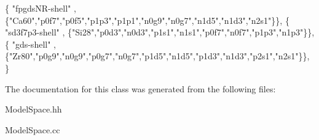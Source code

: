 \begin{DoxyCode}
\{ \textcolor{stringliteral}{"fpgdsNR-shell"}  ,   \{\textcolor{stringliteral}{"Ca60"},\textcolor{stringliteral}{"p0f7"},\textcolor{stringliteral}{"p0f5"},\textcolor{stringliteral}{"p1p3"},\textcolor{stringliteral}{"p1p1"},\textcolor{stringliteral}{"n0g9"},\textcolor{stringliteral}{"n0g7"},\textcolor{stringliteral}{"n1d5"},\textcolor{stringliteral}{"n1d3"},\textcolor{stringliteral}{"n2s1"}\}\}, 
\{ \textcolor{stringliteral}{"sd3f7p3-shell"}  ,   \{\textcolor{stringliteral}{"Si28"},\textcolor{stringliteral}{"p0d3"},\textcolor{stringliteral}{"n0d3"},\textcolor{stringliteral}{"p1s1"},\textcolor{stringliteral}{"n1s1"},\textcolor{stringliteral}{"p0f7"},\textcolor{stringliteral}{"n0f7"},\textcolor{stringliteral}{"p1p3"},\textcolor{stringliteral}{"n1p3"}\}\},
\{ \textcolor{stringliteral}{"gds-shell"} ,        \{\textcolor{stringliteral}{"Zr80"},\textcolor{stringliteral}{"p0g9"},\textcolor{stringliteral}{"n0g9"},\textcolor{stringliteral}{"p0g7"},\textcolor{stringliteral}{"n0g7"},\textcolor{stringliteral}{"p1d5"},\textcolor{stringliteral}{"n1d5"},\textcolor{stringliteral}{"p1d3"},\textcolor{stringliteral}{"n1d3"},\textcolor{stringliteral}{"p2s1"},\textcolor{stringliteral}{"n2s1"}\}\}, 
\}
\end{DoxyCode}


The documentation for this class was generated from the following files\-:\begin{DoxyCompactItemize}
\item 
Model\-Space.\-hh\item 
Model\-Space.\-cc\end{DoxyCompactItemize}
